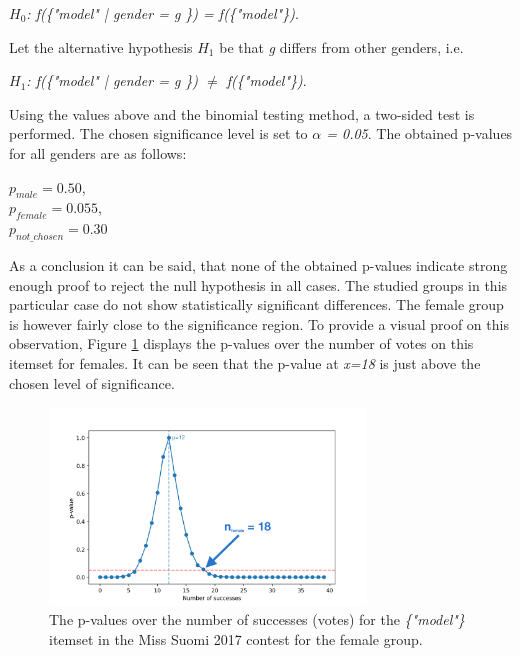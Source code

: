 \begin{center}
    \emph{$H_0$: f(\{"model" | gender = g \}) = f(\{"model"\})}. 
\end{center}

Let the alternative hypothesis \emph{$H_1$} be that \emph{g} differs from other genders, i.e. 

\begin{center}
    \emph{$H_1$: f(\{"model" | gender = g \}) $\neq$ f(\{"model"\})}. 
\end{center}

Using the values above and the binomial testing method, a two-sided test is performed. The chosen significance level is set to \emph{$\alpha$ = 0.05}. The obtained p-values for all genders are as follows:

\begin{center}
    $p_{male}=0.50$, \\
    $p_{female}=0.055$, \\
    $p_{not\_chosen}=0.30$
\end{center}

As a conclusion it can be said, that none of the obtained p-values indicate strong enough proof to reject the null hypothesis in all cases. The studied groups in this particular case do not show statistically significant differences. The female group is however fairly close to the significance region. To provide a visual proof on this observation, Figure \ref{likelihood_distribution_females} displays the p-values over the number of votes on this itemset for females. It can be seen that the p-value at \emph{x=18} is just above the chosen level of significance.

\begin{figure}[h]
    \begin{center}
        \includegraphics[width=0.75\textwidth]{Images/likelihood_distribution_females.png}
        \caption{The p-values over the number of successes (votes) for the \emph{\{"model"\}} itemset in the Miss Suomi 2017 contest for the female group.}
        \label{likelihood_distribution_females}
    \end{center}
\end{figure}

